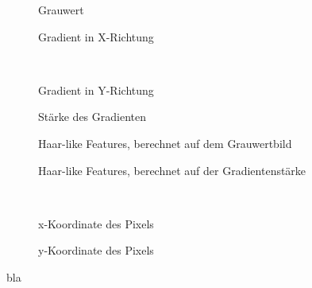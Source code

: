 \documentclass[]{report}
\newlength\figureheight
\newlength\figurewidth
\begin{document}
\begin{enumerate}
						\setlength\figureheight{3.5cm}
						\setlength{}
						\begin{figure}
							\begin{subfigure}{0.45\textwidth}
								\centering
								
								\caption{Grauwert}
								\label{fig:g}
							\end{subfigure}
							\qquad
							\begin{subfigure}{0.45\textwidth}
								\centering
								
								\caption{Gradient in X-Richtung}
								\label{fig:gradx}
							\end{subfigure}	
							\\
							\begin{subfigure}{0.45\textwidth}
								\centering
								
								\caption{Gradient in Y-Richtung}
								\label{fig:grady}
							\end{subfigure}
							\qquad
							\begin{subfigure}{0.45\textwidth}
								\centering
								
								\caption{Stärke des Gradienten}
								\label{fig:m}
							\end{subfigure}	
								\begin{subfigure}{0.45\textwidth}
									\centering
									
									\caption{Haar-like Features, berechnet auf dem Grauwertbild}
									\label{fig:hgrey}
								\end{subfigure}
								\qquad
								\begin{subfigure}{0.45\textwidth}
									\centering
									
									\caption{Haar-like Features, berechnet auf der Gradientenstärke}
									\label{fig:hgrad}
								\end{subfigure}	
								\\
								\begin{subfigure}{0.45\textwidth}
									\centering
									
									\caption{x-Koordinate des Pixels}
									\label{fig:x}
								\end{subfigure}
								\qquad
								\begin{subfigure}{0.45\textwidth}
									\centering
									
									\caption{y-Koordinate des Pixels}
									\label{fig:y}
								\end{subfigure}	
							\caption{bla}
							\label{fig:featurePlot}
						\end{figure}
						

\end{enumerate}
\end{document}
